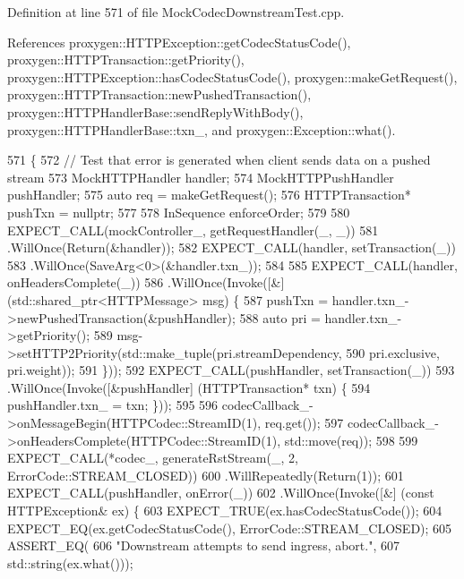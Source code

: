 Definition at line 571 of file Mock\+Codec\+Downstream\+Test.\+cpp.



References proxygen\+::\+H\+T\+T\+P\+Exception\+::get\+Codec\+Status\+Code(), proxygen\+::\+H\+T\+T\+P\+Transaction\+::get\+Priority(), proxygen\+::\+H\+T\+T\+P\+Exception\+::has\+Codec\+Status\+Code(), proxygen\+::make\+Get\+Request(), proxygen\+::\+H\+T\+T\+P\+Transaction\+::new\+Pushed\+Transaction(), proxygen\+::\+H\+T\+T\+P\+Handler\+Base\+::send\+Reply\+With\+Body(), proxygen\+::\+H\+T\+T\+P\+Handler\+Base\+::txn\+\_\+, and proxygen\+::\+Exception\+::what().


\begin{DoxyCode}
571                                                          \{
572   \textcolor{comment}{// Test that error is generated when client sends data on a pushed stream}
573   MockHTTPHandler handler;
574   MockHTTPPushHandler pushHandler;
575   \textcolor{keyword}{auto} req = makeGetRequest();
576   HTTPTransaction* pushTxn = \textcolor{keyword}{nullptr};
577 
578   InSequence enforceOrder;
579 
580   EXPECT\_CALL(mockController\_, getRequestHandler(\_, \_))
581     .WillOnce(Return(&handler));
582   EXPECT\_CALL(handler, setTransaction(\_))
583     .WillOnce(SaveArg<0>(&handler.txn_));
584 
585   EXPECT\_CALL(handler, onHeadersComplete(\_))
586     .WillOnce(Invoke([&] (std::shared\_ptr<HTTPMessage> msg) \{
587           pushTxn = handler.txn_->newPushedTransaction(&pushHandler);
588           \textcolor{keyword}{auto} pri = handler.txn_->getPriority();
589           msg->setHTTP2Priority(std::make\_tuple(pri.streamDependency,
590                                                 pri.exclusive, pri.weight));
591         \}));
592   EXPECT\_CALL(pushHandler, setTransaction(\_))
593     .WillOnce(Invoke([&pushHandler] (HTTPTransaction* txn) \{
594           pushHandler.txn_ = txn; \}));
595 
596   codecCallback\_->onMessageBegin(HTTPCodec::StreamID(1), req.get());
597   codecCallback\_->onHeadersComplete(HTTPCodec::StreamID(1), std::move(req));
598 
599   EXPECT\_CALL(*codec\_, generateRstStream(\_, 2, ErrorCode::STREAM\_CLOSED))
600     .WillRepeatedly(Return(1));
601   EXPECT\_CALL(pushHandler, onError(\_))
602     .WillOnce(Invoke([&] (\textcolor{keyword}{const} HTTPException& ex) \{
603           EXPECT\_TRUE(ex.hasCodecStatusCode());
604           EXPECT\_EQ(ex.getCodecStatusCode(), ErrorCode::STREAM\_CLOSED);
605           ASSERT\_EQ(
606             \textcolor{stringliteral}{"Downstream attempts to send ingress, abort."},
607             std::string(ex.what()));

\end{DoxyCode}
